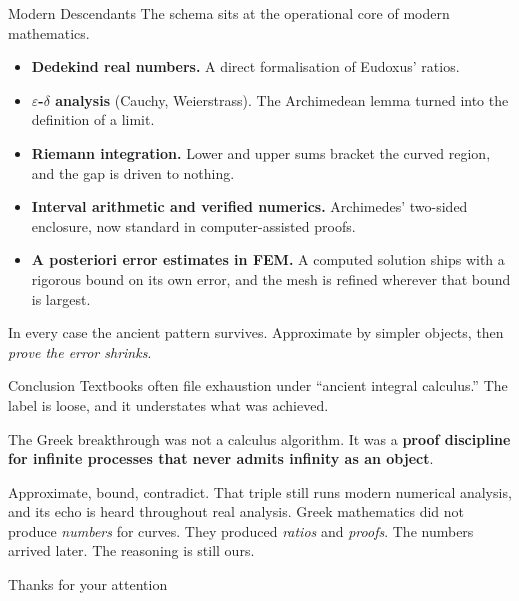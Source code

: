 \documentclass[aspectratio=169]{beamer}
\begin{document}
\begin{frame}{Modern Descendants}
        The schema sits at the operational core of modern mathematics.

        \vspace{0.15cm}
        \begin{itemize}
                \item \textbf{Dedekind real numbers.} A
                        direct formalisation of Eudoxus' ratios.
                \item \textbf{$\varepsilon$-$\delta$ analysis}
                        (Cauchy, Weierstrass). The Archimedean
                        lemma turned into the definition of a limit.
                \item \textbf{Riemann integration.} Lower and upper
                        sums bracket the curved region, and the gap
                        is driven to nothing.
                \item \textbf{Interval arithmetic and verified
                        numerics.} Archimedes' two-sided enclosure,
                        now standard in computer-assisted proofs.
                \item \textbf{A posteriori error estimates in FEM.}
                        A computed solution ships with a rigorous
                        bound on its own error, and the mesh is
                        refined wherever that bound is largest.
        \end{itemize}

        \vspace{0.15cm}
        In every case the ancient pattern survives. Approximate by
        simpler objects, then \emph{prove the error shrinks}.
\end{frame}


\begin{frame}{Conclusion}
        Textbooks often file exhaustion under ``ancient integral
        calculus.'' The label is loose, and it understates what was
        achieved.

        \vspace{0.4cm}
        \begin{shadowbox}
                The Greek breakthrough was not a calculus algorithm.
                It was a \textbf{proof discipline for infinite
                processes that never admits infinity as an object}.
        \end{shadowbox}

        \vspace{0.4cm}
        Approximate, bound, contradict. That triple still runs
        modern numerical analysis, and its echo is heard throughout
        real analysis. Greek mathematics did not produce
        \emph{numbers} for curves. They produced \emph{ratios} and
        \emph{proofs}. The numbers arrived later. The reasoning is
        still ours.
\end{frame}


{
        \begin{frame}
                \vspace*{\fill}
                \begin{center}
                        {\LARGE Thanks for your attention}
                \end{center}
                \vspace*{\fill}
        \end{frame}
}
\end{document}
